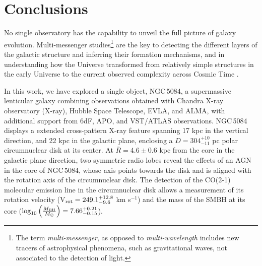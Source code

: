 \documentclass[modern]{CORE-AAS/aastex631}
\begin{document}
\section{Conclusions} \label{sec:CON}
No single observatory has the capability to unveil the full picture of galaxy evolution. Multi-messenger studies\footnote{The term \emph{multi-messenger}, as opposed to \emph{multi-wavelength} includes new tracers of astrophysical phenomena, such as gravitational waves, not associated to the detection of light.} are the key to detecting the different layers of the galactic structure and inferring their formation mechanisms, and in understanding how the Universe transformed from relatively simple structures in the early Universe to the current observed complexity across Cosmic Time  \citep{beckman2021book}. \par 
{}
In this work, we have explored a single object, NGC\,5084, a supermassive lenticular galaxy combining observations obtained with Chandra X-ray observatory (X-ray), Hubble Space Telescope, EVLA, and ALMA, with additional support from 6dF, APO, and VST/ATLAS observations. NGC\,5084 displays a extended cross-pattern X-ray feature spanning 17 kpc in the vertical direction, and 22 kpc in the galactic plane, enclosing a $D=304^{+10}_{-11}$ pc polar circumnuclear disk at its center. At $\overline{R}=4.6\pm0.6$ kpc from the core in the galactic plane direction, two symmetric radio lobes reveal the effects of an AGN in the core of NGC\,5084, whose axis points towards the disk and is aligned with the rotation axis of the circumnuclear disk. The detection of the CO(2-1) molecular emission line in the circumnuclear disk allows a measurement of its rotation velocity (V$_{\rm rot} = 249.1^{+12.8}_{-9.6}$ km s$^{-1}$) and the mass of the SMBH at its core ($\log_{10}\left( \frac{M_{\rm BH}}{M_{\odot}} \right) = 7.66^{+0.21}_{-0.15}$). \par 
{}
\end{document}
